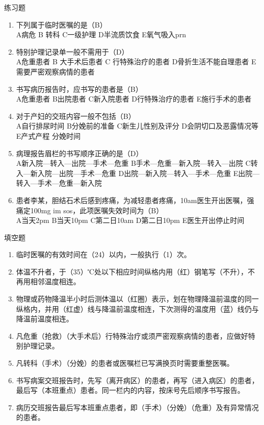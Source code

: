 \documentclass[11pt, a4paper]{ctexart}
\begin{document}
\begin{examplebox}{练习题}
\begin{enumerate}
    \item 下列属于临时医嘱的是（B）\\
    A病危 \quad B 转科 \quad C一级护理 \quad D半流质饮食 \quad E氧气吸入prn
    \item 特别护理记录单一般不需用于（D）\\
    A危重患者 \quad B 大手术后患者 \quad C 行特殊治疗的患者 \quad D骨折生活不能自理患者 \quad E 需要严密观察病情的患者
    \item 书写病历报告时，应书写的患者是（B）\\
    A危重患者 \quad B出院患者 \quad C新入院患者 \quad D行特殊治疗的患者 \quad E施行手术的患者
    \item 对于产妇的交班内容一般不包括（B）\\
    A自行排尿时间 \quad B分娩前的准备 \quad C新生儿性别及评分 \quad D会阴切口及恶露情况等 \quad E产式产程 分娩时间
    \item 病理报告眉栏的书写顺序正确的是（D）\\
    A新入院—转入—出院—手术—危重 \quad B手术—危重—新入院—转入—出院 \quad C转入—新入院—出院—手术—危重 \quad D出院—新入院—转入—手术—危重 \quad E出院—转入—手术—危重—新入院
    \item 患者李某，胆结石术后感到疼痛，为减轻患者疼痛，10am医生开出医嘱，强痛定100mg im sos，此项医嘱失效时间为（B）\\
    A当天2pm \quad B当天10pm \quad C第二日10am \quad D第二日10pm \quad E医生开出停止时间
\end{enumerate}
\end{examplebox}

\begin{tipsbox}{填空题}
\begin{enumerate}
    \item 临时医嘱的有效时间在（24）以内，一般执行（1）次。
    \item 体温不升者，于（35）℃处以下相应时间纵格内用（红）钢笔写（不升），不再用相邻温度相连。
    \item 物理或药物降温半小时后测体温以（红圈）表示，划在物理降温前温度的同一纵格内，并用（红虚）线与降温前温度相连，下次测得的温度用（蓝）线仍与降温前温度相连。
    \item 凡危重（抢救）（大手术后）行特殊治疗或须严密观察病情的患者，应做好特别护理记录。
    \item 凡转科（手术）（分娩）的患者或医嘱栏已写满换页时需要重整医嘱。
    \item 书写病案交班报告时，先写（离开病区）的患者，再写（进入病区）的患者，最后写（本班重点）患者。同一栏内的内容，按床号先后顺序书写报告。
    \item 病历交班报告最后写本班重点患者，即（手术）（分娩）（危重）及有异常情况的患者。
\end{enumerate}
\end{tipsbox}
\end{document}
